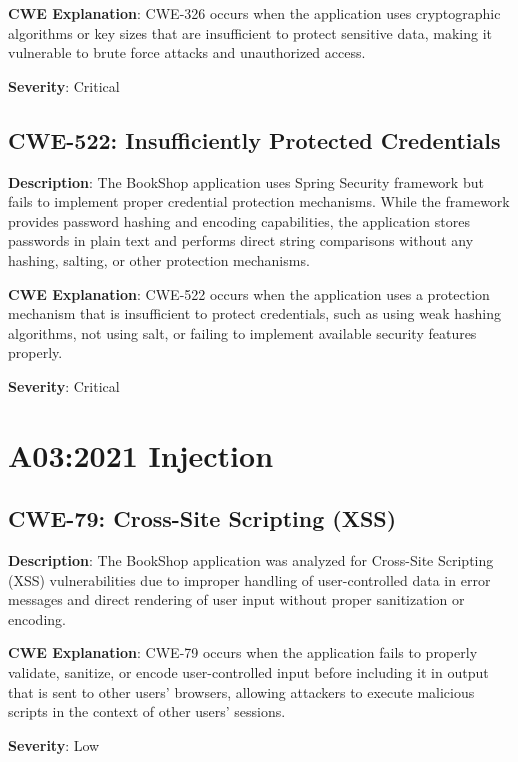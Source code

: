 \documentclass[]{UCD_CS_FYP_Report}
\begin{document}
\textbf{CWE Explanation}: CWE-326 occurs when the application uses cryptographic algorithms or key sizes that are insufficient to protect sensitive data, making it vulnerable to brute force attacks and unauthorized access.

\textbf{Severity}: Critical



\section{CWE-522: Insufficiently Protected Credentials}

\textbf{Description}: The BookShop application uses Spring Security framework but fails to implement proper credential protection mechanisms. While the framework provides password hashing and encoding capabilities, the application stores passwords in plain text and performs direct string comparisons without any hashing, salting, or other protection mechanisms.

\textbf{CWE Explanation}: CWE-522 occurs when the application uses a protection mechanism that is insufficient to protect credentials, such as using weak hashing algorithms, not using salt, or failing to implement available security features properly.

\textbf{Severity}: Critical



\chapter{A03:2021 Injection}

\section{CWE-79: Cross-Site Scripting (XSS)}

\textbf{Description}: The BookShop application was analyzed for Cross-Site Scripting (XSS) vulnerabilities due to improper handling of user-controlled data in error messages and direct rendering of user input without proper sanitization or encoding.

\textbf{CWE Explanation}: CWE-79 occurs when the application fails to properly validate, sanitize, or encode user-controlled input before including it in output that is sent to other users' browsers, allowing attackers to execute malicious scripts in the context of other users' sessions.

\textbf{Severity}: Low
\end{document}

